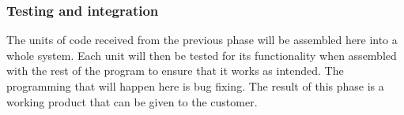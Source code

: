 \subsubsection{Testing and integration}


The units of code received from the previous phase will be assembled here into a whole system. Each unit will then be tested for its functionality when assembled with the rest of the program to ensure that it works as intended\cite{waterfallexplained}. The programming that will happen here is bug fixing\cite{waterfallexplained}. The result of this phase is a working product that can be given to the customer\cite{waterfallexplained}.